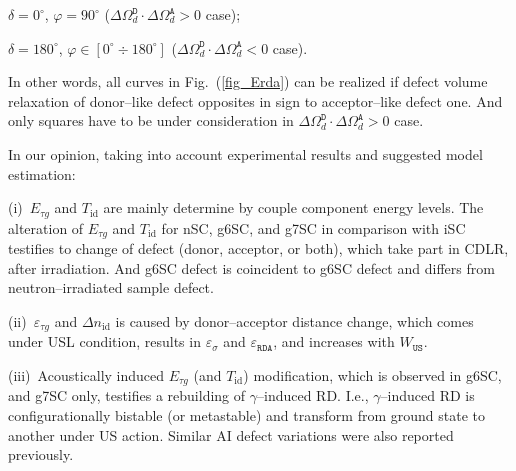 \documentclass[aip,jap, amsmath,amssymb,reprint]{revtex4-1}
\begin{document}

\noindent  $\delta=0^\circ$, $\varphi=90^\circ$ ($\Delta\Omega_d^\mathtt{D}\cdot\Delta\Omega_d^\mathtt{A}>0$ case);

\noindent  $\delta=180^\circ$, $\varphi\in[0^\circ\div 180^\circ]$ ($\Delta\Omega_d^\mathtt{D}\cdot\Delta\Omega_d^\mathtt{A}<0$ case).

\noindent
In other words, all curves in Fig.~(\ref{fig_Erda}) can be realized if defect volume relaxation of donor--like defect opposites in sign to acceptor--like defect one.
And only squares have to be under consideration in $\Delta\Omega_d^\mathtt{D}\cdot\Delta\Omega_d^\mathtt{A}>0$ case.

In our opinion, taking into account experimental results and suggested model estimation:

\noindent
(i)~$E_{\tau g}$ and $T_{\mathrm{id}}$ are mainly determine by couple component energy levels.
The alteration of $E_{\tau g}$ and $T_{\mathrm{id}}$ for nSC, g6SC, and g7SC in comparison with iSC testifies to change of defect (donor, acceptor, or both),
which take part in CDLR, after irradiation.
And g6SC defect is coincident to g6SC defect and differs from neutron--irradiated sample defect.

\noindent
(ii)~$\varepsilon_{\tau g}$ and  $\Delta n_{\mathrm{id}}$ is caused by donor--acceptor distance change, which  
comes under USL condition, 
results in $\varepsilon_{\sigma}$ and $\varepsilon_{\mathtt{RDA}}$,
and increases with $W_{\mathtt{US}}$.

\noindent
(iii)~Acoustically induced $E_{\tau g}$ (and $T_{\mathrm{id}}$) modification, which is observed in g6SC, and g7SC only,
testifies a rebuilding of  $\gamma$--induced RD.
I.e., $\gamma$--induced RD is conﬁgurationally bistable (or metastable) and transform from ground state to another under US action.
Similar AI defect variations were also reported previously\cite{Wosinski,Ostapenko1994,Olikh2009Sem,YOlikhTPL2011}.
\end{document}
